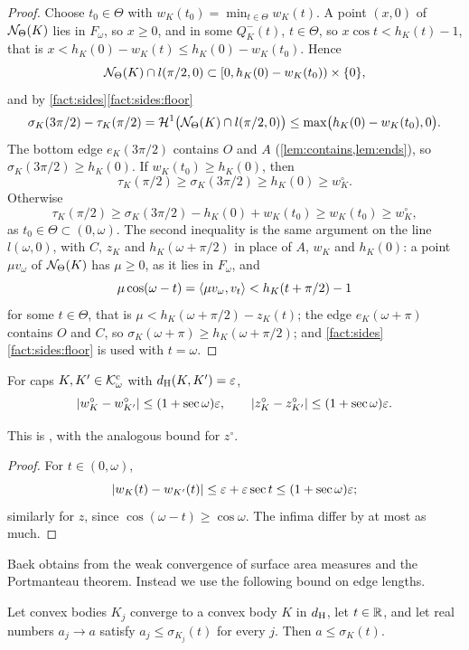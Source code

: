 \begin{proof}
Choose $t_0\in\Theta$ with $w_K(t_0)=\min_{t\in\Theta}w_K(t)$. A point $(x,0)$
of $\mathcal{N}_\Theta(K)$ lies in $F_\omega$, so $x\ge0$, and in some $Q^-_K(t)$,
$t\in\Theta$, so $x\cos t<h_K(t)-1$, that is $x<h_K(0)-w_K(t)\le
h_K(0)-w_K(t_0)$. Hence
\[
  \mathcal{N}_\Theta(K)\cap l(\pi/2,0)\subset[0,h_K(0)-w_K(t_0))\times\{0\},
\]
and by \cref{fact:sides}\ref{fact:sides:floor}
\[
  \sigma_K(3\pi/2)-\tau_K(\pi/2)=\mathcal{H}^1\bigl(\mathcal{N}_\Theta(K)\cap l(\pi/2,0)\bigr)
    \le\max\bigl(h_K(0)-w_K(t_0),0\bigr).
\]
The bottom edge $e_K(3\pi/2)$ contains $O$ and $A$
(\cref{lem:contains,lem:ends}), so $\sigma_K(3\pi/2)\ge h_K(0)$. If $w_K(t_0)\ge
h_K(0)$, then
\[
  \tau_K(\pi/2)\ge\sigma_K(3\pi/2)\ge h_K(0)\ge w^\circ_K.
\]
Otherwise
\[
  \tau_K(\pi/2)\ge\sigma_K(3\pi/2)-h_K(0)+w_K(t_0)\ge w_K(t_0)\ge w^\circ_K,
\]
as $t_0\in\Theta\subset(0,\omega)$. The second inequality is the same argument
on the line $l(\omega,0)$, with $C$, $z_K$ and $h_K(\omega+\pi/2)$ in place of
$A$, $w_K$ and $h_K(0)$: a point $\mu v_\omega$ of $\mathcal{N}_\Theta(K)$ has
$\mu\ge0$, as it lies in $F_\omega$, and
\[
  \mu\cos(\omega-t)=\langle \mu v_\omega,v_t\rangle<h_K(t+\pi/2)-1
\]
for some $t\in\Theta$, that is $\mu<h_K(\omega+\pi/2)-z_K(t)$; the edge
$e_K(\omega+\pi)$ contains $O$ and $C$, so $\sigma_K(\omega+\pi)\ge
h_K(\omega+\pi/2)$; and \cref{fact:sides}\ref{fact:sides:floor} is used with
$t=\omega$.
\end{proof}

\begin{lemma}[continuity]\label{lem:cont}
For caps $K,K'\in\mathcal{K}^{\mathrm{c}}_\omega$ with $d_{\mathrm{H}}(K,K')=\varepsilon$,
\[
  \lvert w^\circ_K-w^\circ_{K'}\rvert\le(1+\sec\omega)\varepsilon,\qquad
  \lvert z^\circ_K-z^\circ_{K'}\rvert\le(1+\sec\omega)\varepsilon.
\]
\end{lemma}

This is , with the analogous bound for $z^\circ$.

\begin{proof}
For $t\in(0,\omega)$,
\[
  \lvert w_K(t)-w_{K'}(t)\rvert\le\varepsilon+\varepsilon\sec t\le(1+\sec\omega)\varepsilon;
\]
similarly for $z$, since $\cos(\omega-t)\ge\cos\omega$. The infima differ by at
most as much.
\end{proof}

Baek obtains  from the weak convergence of surface area
measures  and the Portmanteau theorem. Instead we use the
following bound on edge lengths.

\begin{lemma}\label{lem:usc}
Let convex bodies $K_j$ converge to a convex body $K$ in $d_{\mathrm{H}}$, let $t\in\mathbb{R}$,
and let real numbers $a_j\to a$ satisfy $a_j\le\sigma_{K_j}(t)$ for every $j$.
Then $a\le\sigma_K(t)$.
\end{lemma}


